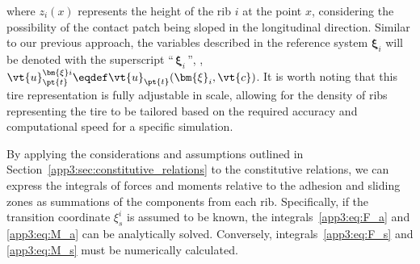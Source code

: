 %
where $z_i(x)$ represents the height of the rib $i$ at the point $x$, considering the possibility of the contact patch being sloped in the longitudinal direction. Similar to our previous approach, the variables described in the reference system $\bm{\xi}_i$ will be denoted with the superscript ``$\,\bm{\xi}_{i}\,$'', \eg{}, $\vt{u}_{\pt{t}}^{\bm{\xi}i} \eqdef \vt{u}_{\pt{t}}(\bm{\xi}_{i}, \vt{c})$. It is worth noting that this tire representation is fully adjustable in scale, allowing for the density of ribs representing the tire to be tailored based on the required accuracy and computational speed for a specific simulation.



By applying the considerations and assumptions outlined in Section~\ref{app3:sec:constitutive_relations} to the constitutive relations, we can express the integrals of forces and moments relative to the adhesion and sliding zones as summations of the components from each rib. Specifically, if the transition coordinate $\xi_s^i$ is assumed to be known, the integrals~\eqref{app3:eq:F_a} and \eqref{app3:eq:M_a} can be analytically solved. Conversely, integrals~\eqref{app3:eq:F_s} and \eqref{app3:eq:M_s} must be numerically calculated.


